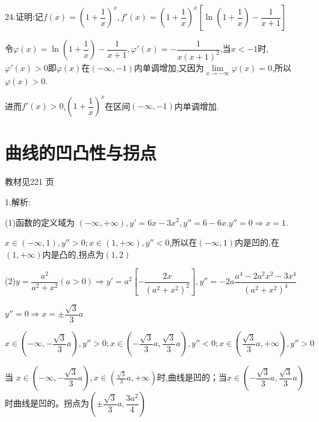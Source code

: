 24.证明:记$f\left( x \right) = {\left( {1 + \dfrac{1}{x}} \right)^x},f'\left( x \right) = {\left( {1 + \dfrac{1}{x}} \right)^x}\left[ {\ln \left( {1 + \dfrac{1}{x}} \right) - \dfrac{1}{{x + 1}}} \right]$

令$\varphi \left( x \right) = \ln \left( {1 + \dfrac{1}{x}} \right) - \dfrac{1}{{x + 1}},\varphi '\left( x \right) =  - \dfrac{1}{{x{{\left( {x + 1} \right)}^2}}}$,当$x <  - 1$时,$\varphi '\left( x \right) > 0$即$\varphi \left( x \right)$在$\left( { - \infty , - 1} \right)$内单调增加,又因为$\mathop {\lim }\limits_{x \to  - \infty } \varphi \left( x \right) = 0$,所以$\varphi \left( x \right) > 0$.

进而$f'\left( x \right) > 0$,${\left( {1 + \dfrac{1}{x}} \right)^x}$在区间$\left( { - \infty , - 1} \right)$内单调增加.


\section{曲线的凹凸性与拐点}
\begin{flushright}
  \color{zhanqing!80}
   教材见221 页 %
\end{flushright}

1.解析:

(1)函数的定义域为
$\left( { - \infty , + \infty } \right),y' = 6x - 3{x^2},y'' = 6 - 6x.y'' = 0 \Rightarrow x = 1.$

$x \in \left( { - \infty ,1} \right),y'' > 0;x \in \left( {1, + \infty } \right),y'' < 0$,所以在$ \left( { - \infty ,1} \right)$内是凹的,在$\left( {1, + \infty } \right)$内是凸的,拐点为$\left( {1,2} \right)$

(2)$y = \dfrac{{{a^2}}}{{{a^2} + {x^2}}}\left( {a > 0} \right) \Rightarrow y' = {a^2}\left[ { - \dfrac{{2x}}{{{{\left( {{a^2} + {x^2}} \right)}^2}}}} \right],y'' =  - 2a\dfrac{{{a^4} - 2{a^2}{x^2} - 3{x^4}}}{{{{\left( {{a^2} + {x^2}} \right)}^4}}}$

$y'' = 0 \Rightarrow x =  \pm \dfrac{{\sqrt 3 }}{3}a$

$x \in \left( { - \infty , - \dfrac{{\sqrt 3 }}{3}a} \right),y'' > 0;x \in \left( { - \dfrac{{\sqrt 3 }}{3}a,\dfrac{{\sqrt 3 }}{3}a} \right),y'' < 0;x \in \left( {\dfrac{{\sqrt 3 }}{3}a, + \infty } \right),y'' > 0$

当 $x \in \left( { - \infty , - \dfrac{{\sqrt 3 }}{3}a} \right) ,x \in \left( {\frac{{\sqrt 3 }}{3}a, + \infty } \right)$时,曲线是凹的；当$x \in \left( { - \dfrac{{\sqrt 3 }}{3}a,\dfrac{{\sqrt 3 }}{3}a} \right)$时曲线是凹的。拐点为$\left( { \pm \dfrac{{\sqrt 3 }}{3}a,\dfrac{{3{a^2}}}{4}} \right)$

